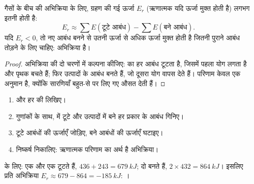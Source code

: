 \begin{proposition}[अभिक्रिया ऊर्जा का अनुमान]\label{prop:g11:reaction-energy:estimate}
गैसों के बीच की अभिक्रिया के लिए, ग्रहण की गई ऊर्जा $E_r$ (ऋणात्मक यदि
ऊर्जा मुक्त होती है) लगभग इतनी होती है:
\[
  E_r \approx \sum E(\text{टूटे आबंध}) - \sum E(\text{बने आबंध}) .
\]
यदि $E_r < 0$, तो नए आबंध बनने से उतनी ऊर्जा से अधिक ऊर्जा मुक्त होती है
जितनी पुराने आबंध तोड़ने के लिए चाहिए: अभिक्रिया  है।
\end{proposition}

\begin{proof}
अभिक्रिया की दो चरणों में कल्पना कीजिए:  का हर आबंध टूटता है,
जिसमें पहला योग लगता है और पृथक  बचते हैं; फिर
उत्पादों के आबंध बनते हैं, जो दूसरा योग वापस देते हैं। परिणाम केवल एक
अनुमान है, क्योंकि सारणियाँ बहुत-से  पर लिए गए औसत देती हैं।
\end{proof}

\begin{method}[आबंध ऊर्जाओं से अभिक्रिया ऊर्जा का अनुमान]\label{met:g11:reaction-energy:bonds}
\begin{enumerate}
  \item {} और हर  की 
        लिखिए।
  \item गुणांकों के साथ,  में टूटे और उत्पादों में बने
        हर प्रकार के आबंध गिनिए।
  \item टूटे आबंधों की ऊर्जाएँ जोड़िए, बने
        आबंधों की ऊर्जाएँ घटाइए।
  \item निष्कर्ष निकालिए: ऋणात्मक परिणाम का अर्थ है  अभिक्रिया।
\end{enumerate}
\end{method}

\begin{example}[हाइड्रोजन और क्लोरीन]\label{ex:g11:reaction-energy:hcl}
 के लिए: एक  और एक  टूटते हैं,
$436 + 243 = \qty{679}{kJ}$; दो  बनते हैं, $2 \times 432 =
\qty{864}{kJ}$। इसलिए प्रति  अभिक्रिया $E_r \approx 679 - 864 = \qty{-185}{kJ}$:
।
\end{example}


